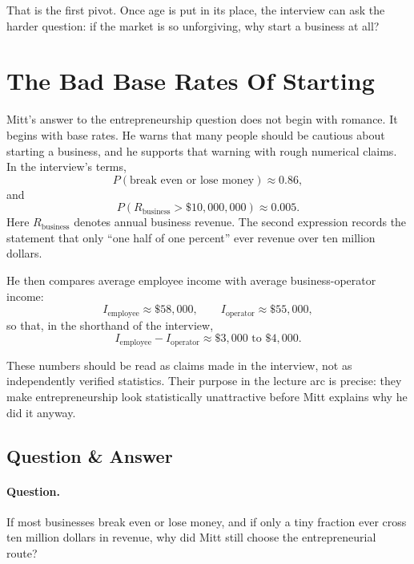 That is the first pivot. Once age is put in its place, the interview can ask the harder question: if the market is so unforgiving, why start a business at all?

\section{The Bad Base Rates Of Starting}

Mitt's answer to the entrepreneurship question does not begin with romance. It begins with base rates. He warns that many people should be cautious about starting a business, and he supports that warning with rough numerical claims. In the interview's terms,
\begin{equation}
P(\text{break even or lose money}) \approx 0.86,
\end{equation}
and
\begin{equation}
P(R_{\text{business}}>\$10{,}000{,}000)\approx 0.005.
\end{equation}
Here \(R_{\text{business}}\) denotes annual business revenue. The second expression records the statement that only ``one half of one percent'' ever revenue over ten million dollars.

He then compares average employee income with average business-operator income:
\begin{equation}
I_{\text{employee}}\approx \$58{,}000,\qquad
I_{\text{operator}}\approx \$55{,}000,
\end{equation}
so that, in the shorthand of the interview,
\begin{equation}
I_{\text{employee}}-I_{\text{operator}}
\approx \$3{,}000\text{ to }\$4{,}000.
\end{equation}

These numbers should be read as claims made in the interview, not as independently verified statistics. Their purpose in the lecture arc is precise: they make entrepreneurship look statistically unattractive before Mitt explains why he did it anyway.

\subsection{Question \& Answer}

\paragraph{Question.}
If most businesses break even or lose money, and if only a tiny fraction ever cross ten million dollars in revenue, why did Mitt still choose the entrepreneurial route?

